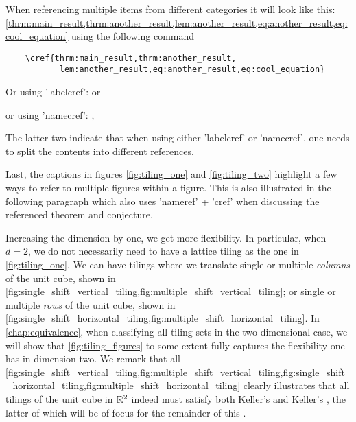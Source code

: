 \documentclass[../thesis.tex]{subfiles}
\begin{document}

When referencing multiple items from different categories it will look like this: \cref{thrm:main_result,thrm:another_result,lem:another_result,eq:another_result,eq:cool_equation} using the following command
\begin{verbatim}
    \cref{thrm:main_result,thrm:another_result,
           lem:another_result,eq:another_result,eq:cool_equation}
\end{verbatim}
Or using 'labelcref':
 or 

or using 'namecref':
, 

The latter two indicate that when using either 'labelcref' or 'namecref', one needs to split the contents into different references. 


Last, the captions in figures \cref{fig:tiling_one} and \cref{fig:tiling_two} highlight a few ways to refer to multiple figures within a figure. This is also illustrated in the following paragraph which also uses 'nameref' + 'cref' when discussing the referenced theorem and conjecture. 

Increasing the dimension by one, we get more flexibility. In particular, when $d=2$, we do not necessarily need to have a lattice tiling as the one in \cref{fig:tiling_one}. We can have tilings where we translate single or multiple \emph{columns} of the unit cube, shown in \cref{fig:single_shift_vertical_tiling,fig:multiple_shift_vertical_tiling}; or single or multiple \emph{rows} of the unit cube, shown in \cref{fig:single_shift_horizontal_tiling,fig:multiple_shift_horizontal_tiling}. In \cref{chap:equivalence}, when classifying all tiling sets in the two-dimensional case, we will show that \cref{fig:tiling_figures} to some extent fully captures the flexibility one has in dimension two. We remark that all \cref{fig:single_shift_vertical_tiling,fig:multiple_shift_vertical_tiling,fig:single_shift_horizontal_tiling,fig:multiple_shift_horizontal_tiling} clearly illustrates that all tilings of the unit cube in $\mathbb{R}^2$ indeed must satisfy both Keller's  and Keller's , the latter of which will be of focus for the remainder of this .
\end{document}
